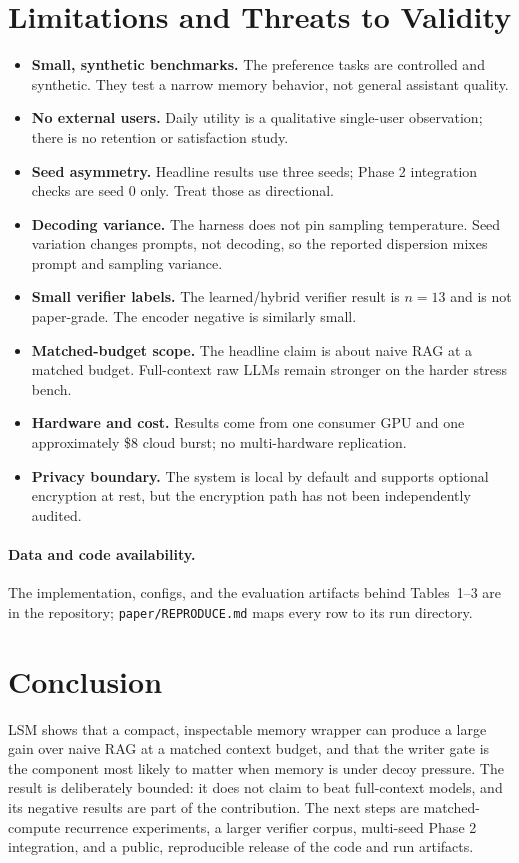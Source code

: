 \documentclass[11pt]{article}
\begin{document}
\section{Limitations and Threats to Validity}
\begin{itemize}
  \item \textbf{Small, synthetic benchmarks.} The preference tasks are controlled and synthetic. They test a narrow memory behavior, not general assistant quality.
  \item \textbf{No external users.} Daily utility is a qualitative single-user observation; there is no retention or satisfaction study.
  \item \textbf{Seed asymmetry.} Headline results use three seeds; Phase 2 integration checks are seed 0 only. Treat those as directional.
  \item \textbf{Decoding variance.} The harness does not pin sampling temperature. Seed variation changes prompts, not decoding, so the reported dispersion mixes prompt and sampling variance.
  \item \textbf{Small verifier labels.} The learned/hybrid verifier result is $n=13$ and is not paper-grade. The encoder negative is similarly small.
  \item \textbf{Matched-budget scope.} The headline claim is about naive RAG at a matched budget. Full-context raw LLMs remain stronger on the harder stress bench.
  \item \textbf{Hardware and cost.} Results come from one consumer GPU and one approximately \$8 cloud burst; no multi-hardware replication.
  \item \textbf{Privacy boundary.} The system is local by default and supports optional encryption at rest, but the encryption path has not been independently audited.
\end{itemize}

\paragraph{Data and code availability.}
The implementation, configs, and the evaluation artifacts behind Tables~1--3 are in the repository; \texttt{paper/REPRODUCE.md} maps every row to its run directory.

\section{Conclusion}
LSM shows that a compact, inspectable memory wrapper can produce a large gain over naive RAG at a matched context budget, and that the writer gate is the component most likely to matter when memory is under decoy pressure. The result is deliberately bounded: it does not claim to beat full-context models, and its negative results are part of the contribution. The next steps are matched-compute recurrence experiments, a larger verifier corpus, multi-seed Phase 2 integration, and a public, reproducible release of the code and run artifacts.
\end{document}
